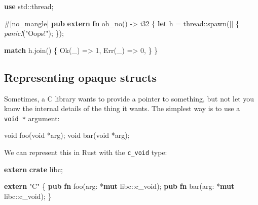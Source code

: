 \documentclass[a4paper,]{book}
\newenvironment{Shaded}{\begin{snugshade}}{\end{snugshade}}
\newcommand{\KeywordTok}[1]{\textcolor[rgb]{0.13,0.29,0.53}{\textbf{{#1}}}}
\newcommand{\DataTypeTok}[1]{\textcolor[rgb]{0.13,0.29,0.53}{{#1}}}
\newcommand{\DecValTok}[1]{\textcolor[rgb]{0.00,0.00,0.81}{{#1}}}
\newcommand{\ConstantTok}[1]{\textcolor[rgb]{0.00,0.00,0.00}{{#1}}}
\newcommand{\StringTok}[1]{\textcolor[rgb]{0.31,0.60,0.02}{{#1}}}
\newcommand{\PreprocessorTok}[1]{\textcolor[rgb]{0.56,0.35,0.01}{\textit{{#1}}}}
\newcommand{\AttributeTok}[1]{\textcolor[rgb]{0.77,0.63,0.00}{{#1}}}
\newcommand{\NormalTok}[1]{{#1}}
\begin{document}
\begin{Shaded}
\begin{Highlighting}[]
\KeywordTok{use} \NormalTok{std::thread;}

\AttributeTok{#[}\NormalTok{no_mangle}\AttributeTok{]}
\KeywordTok{pub} \KeywordTok{extern} \KeywordTok{fn} \NormalTok{oh_no() -> }\DataTypeTok{i32} \NormalTok{\{}
    \KeywordTok{let} \NormalTok{h = thread::spawn(|| \{}
        \PreprocessorTok{panic!}\NormalTok{(}\StringTok{"Oops!"}\NormalTok{);}
    \NormalTok{\});}

    \KeywordTok{match} \NormalTok{h.join() \{}
        \ConstantTok{Ok}\NormalTok{(_) => }\DecValTok{1}\NormalTok{,}
        \ConstantTok{Err}\NormalTok{(_) => }\DecValTok{0}\NormalTok{,}
    \NormalTok{\}}
\NormalTok{\}}
\end{Highlighting}
\end{Shaded}

\subsection{Representing opaque
structs}\label{representing-opaque-structs}

Sometimes, a C library wants to provide a pointer to something, but not
let you know the internal details of the thing it wants. The simplest
way is to use a \texttt{void\ *} argument:

\begin{Shaded}
\begin{Highlighting}[]
\DataTypeTok{void} \NormalTok{foo(}\DataTypeTok{void} \NormalTok{*arg);}
\DataTypeTok{void} \NormalTok{bar(}\DataTypeTok{void} \NormalTok{*arg);}
\end{Highlighting}
\end{Shaded}

We can represent this in Rust with the \texttt{c\_void} type:

\begin{Shaded}
\begin{Highlighting}[]
\KeywordTok{extern} \KeywordTok{crate} \NormalTok{libc;}

\KeywordTok{extern} \StringTok{"C"} \NormalTok{\{}
    \KeywordTok{pub} \KeywordTok{fn} \NormalTok{foo(arg: *}\KeywordTok{mut} \NormalTok{libc::}\DataTypeTok{c_void}\NormalTok{);}
    \KeywordTok{pub} \KeywordTok{fn} \NormalTok{bar(arg: *}\KeywordTok{mut} \NormalTok{libc::}\DataTypeTok{c_void}\NormalTok{);}
\NormalTok{\}}
\end{Highlighting}
\end{Shaded}
\end{document}
